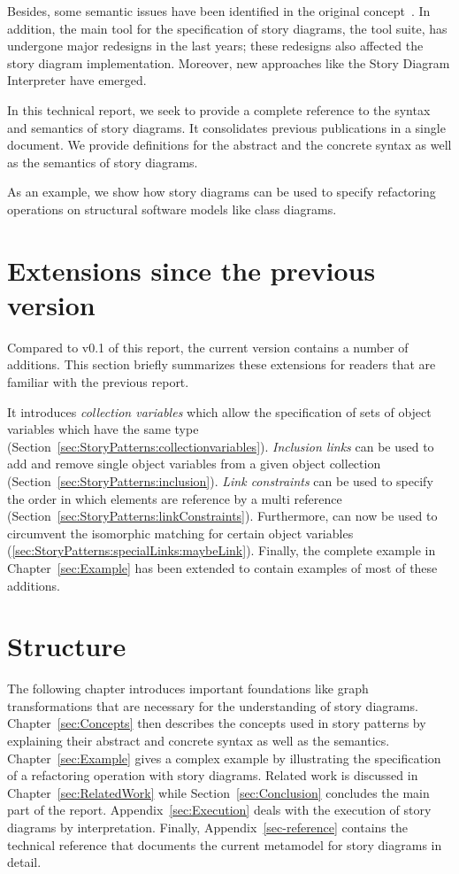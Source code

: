 Besides, some semantic issues have been identified in the original concept~\cite{TMG06}.
In addition, the main tool for the specification of story diagrams, the \fuj tool suite, has undergone major redesigns in the last years; these redesigns also affected the story diagram implementation.
Moreover, new approaches like the Story Diagram Interpreter have emerged.

In this technical report, we seek to provide a complete reference to the syntax and semantics of story diagrams.
It consolidates previous publications in a single document.
We provide definitions for the abstract and the concrete syntax as well as the semantics of story diagrams.

As an example, we show how story diagrams can be used to specify refactoring operations on structural software models like class diagrams.

\section{Extensions since the previous version}
Compared to v0.1 of this report, the current version contains a number of additions.
This section briefly summarizes these extensions for readers that are familiar with the previous report.

It introduces \emph{collection variables} which allow the specification of sets of object variables which have the same type (Section~\ref{sec:StoryPatterns:collectionvariables}).
\emph{Inclusion links} can be used to add and remove single object variables from a given object collection (Section~\ref{sec:StoryPatterns:inclusion}).
\emph{Link constraints} can be used to specify the order in which elements are reference by a multi reference (Section~\ref{sec:StoryPatterns:linkConstraints}).
Furthermore,  can now be used to circumvent the isomorphic matching for certain object variables (\ref{sec:StoryPatterns:specialLinks:maybeLink}).
Finally, the complete example in Chapter~\ref{sec:Example} has been extended to contain examples of most of these additions.

\section{Structure}
The following chapter introduces important foundations like graph transformations that are necessary for the understanding of story diagrams.
Chapter~\ref{sec:Concepts} then describes the concepts used in story patterns by explaining their abstract and concrete syntax as well as the semantics.
Chapter~\ref{sec:Example} gives a complex example by illustrating the specification of a refactoring operation with story diagrams.
Related work is discussed in Chapter~\ref{sec:RelatedWork} while Section~\ref{sec:Conclusion} concludes the main part of the report.
Appendix~\ref{sec:Execution} deals with the execution of story diagrams by interpretation.
Finally, Appendix~\ref{sec-reference} contains the technical reference that documents the current metamodel for story diagrams in detail.